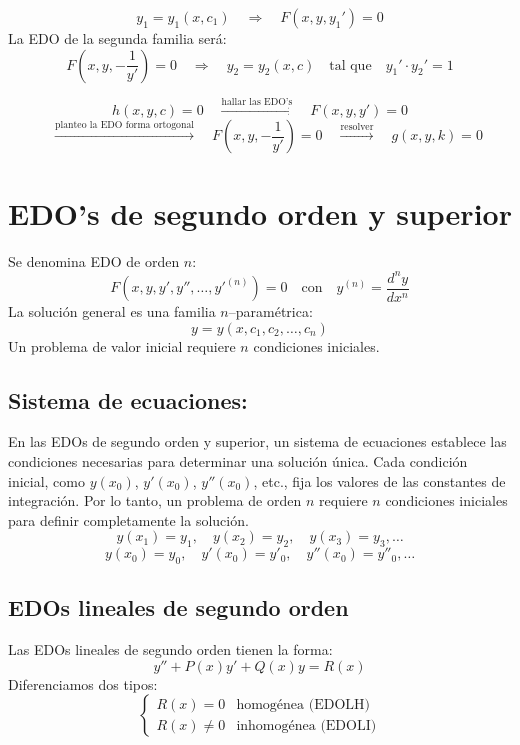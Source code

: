 \documentclass[a4paper,12pt]{article}
\begin{document}
\[
y_1 = y_1(x, c_1) \quad \Longrightarrow \quad F(x, y, y_1') = 0
\]
La EDO de la segunda familia será:
\vspace{0,1 em}
\[
F\left(x, y, -\frac{1}{y'}\right) = 0 
\quad \Longrightarrow \quad y_2 = y_2(x, c) 
\quad \text{tal que} \quad y_1' \cdot y_2' = 1
\]

\[
h(x, y, c) = 0 
\quad \xrightarrow{\text{hallar las EDO's}} \quad 
F(x, y, y') = 0
\]
\vspace{0,1 em}
\[
\quad \xrightarrow{\text{planteo la EDO forma ortogonal}} \quad 
F\left(x, y, -\frac{1}{y'}\right) = 0 
\quad \xrightarrow{\text{resolver}} \quad 
g(x, y, k) = 0
\]

\newpage
\section{EDO's de segundo orden y superior}
\noindent
Se denomina EDO de orden $n$: 
\[
F(x, y, y', y'', \ldots, y'^{(n)}) = 0 
\quad \text{con} \quad y^{(n)} = \frac{d^n y}{dx^n}
\]
La solución general es una familia $n$–paramétrica: 
\[
y = y(x, c_1, c_2, \ldots, c_n)
\]
Un problema de valor inicial requiere $n$ condiciones iniciales.

\subsection*{Sistema de ecuaciones:}
\noindent
En las EDOs de segundo orden y superior, un sistema de ecuaciones establece las condiciones necesarias para determinar una solución única.  
Cada condición inicial, como \( y(x_0) \), \( y'(x_0) \), \( y''(x_0) \), etc., fija los valores de las constantes de integración.  
Por lo tanto, un problema de orden \( n \) requiere \( n \) condiciones iniciales para definir completamente la solución.
\[
y(x_1) = y_1, \quad y(x_2) = y_2, \quad y(x_3) = y_3, \ldots
\]
\[
y(x_0) = y_0, \quad y'(x_0) = y'_0, \quad y''(x_0) = y''_0, \ldots
\]

\subsection{EDOs lineales de segundo orden}
\noindent
Las EDOs lineales de segundo orden tienen la forma:
\[
y'' + P(x)y' + Q(x)y = R(x)
\]
Diferenciamos dos tipos:
\[
\begin{cases}
R(x) = 0 & \text{homogénea (EDOLH)} \\
R(x) \neq 0 & \text{inhomogénea (EDOLI)}
\end{cases}
\]
\end{document}
